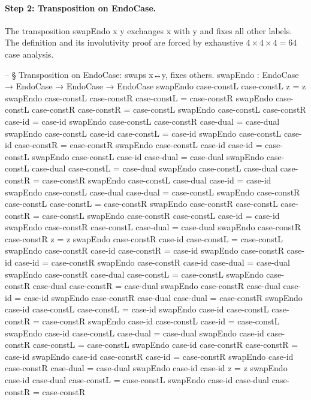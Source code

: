 \documentclass[11pt,a4paper]{book}
\def\texttt#1{#1}%
\begin{document}
\paragraph{Step 2: Transposition on EndoCase.}
The transposition \texttt{swapEndo x y} exchanges \texttt{x} with \texttt{y} and fixes all other labels.
The definition and its involutivity proof are forced by exhaustive $4 \times 4 \times 4 = 64$ case analysis.

\begin{code}
-- § Transposition on EndoCase: swaps x↔y, fixes others.
swapEndo : EndoCase → EndoCase → EndoCase → EndoCase
swapEndo case-constL case-constL z = z
swapEndo case-constL case-constR case-constL = case-constR
swapEndo case-constL case-constR case-constR = case-constL
swapEndo case-constL case-constR case-id     = case-id
swapEndo case-constL case-constR case-dual   = case-dual
swapEndo case-constL case-id     case-constL = case-id
swapEndo case-constL case-id     case-constR = case-constR
swapEndo case-constL case-id     case-id     = case-constL
swapEndo case-constL case-id     case-dual   = case-dual
swapEndo case-constL case-dual   case-constL = case-dual
swapEndo case-constL case-dual   case-constR = case-constR
swapEndo case-constL case-dual   case-id     = case-id
swapEndo case-constL case-dual   case-dual   = case-constL
swapEndo case-constR case-constL case-constL = case-constR
swapEndo case-constR case-constL case-constR = case-constL
swapEndo case-constR case-constL case-id     = case-id
swapEndo case-constR case-constL case-dual   = case-dual
swapEndo case-constR case-constR z = z
swapEndo case-constR case-id     case-constL = case-constL
swapEndo case-constR case-id     case-constR = case-id
swapEndo case-constR case-id     case-id     = case-constR
swapEndo case-constR case-id     case-dual   = case-dual
swapEndo case-constR case-dual   case-constL = case-constL
swapEndo case-constR case-dual   case-constR = case-dual
swapEndo case-constR case-dual   case-id     = case-id
swapEndo case-constR case-dual   case-dual   = case-constR
swapEndo case-id case-constL case-constL = case-id
swapEndo case-id case-constL case-constR = case-constR
swapEndo case-id case-constL case-id     = case-constL
swapEndo case-id case-constL case-dual   = case-dual
swapEndo case-id case-constR case-constL = case-constL
swapEndo case-id case-constR case-constR = case-id
swapEndo case-id case-constR case-id     = case-constR
swapEndo case-id case-constR case-dual   = case-dual
swapEndo case-id case-id z = z
swapEndo case-id case-dual case-constL = case-constL
swapEndo case-id case-dual case-constR = case-constR

\end{code}
\end{document}
